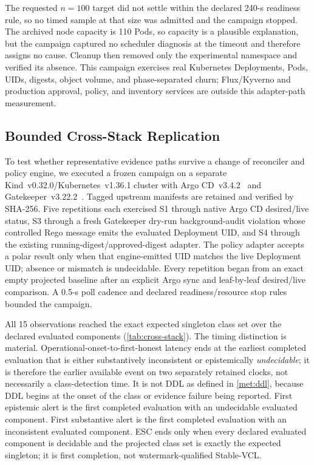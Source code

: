 The requested $n=100$ target did not settle within the declared 240-s
readiness rule, so no timed sample at that size was admitted and the campaign
stopped. The archived node capacity is 110 Pods, so capacity is a plausible
explanation, but the campaign captured no scheduler diagnosis at the timeout
and therefore assigns no cause. Cleanup then removed only the experimental
namespace and verified its absence. This
campaign exercises real Kubernetes Deployments, Pods, UIDs, digests, object
volume, and phase-separated churn; Flux/Kyverno and production approval,
policy, and inventory services are outside this adapter-path measurement.

\subsection{Bounded Cross-Stack Replication}
To test whether representative evidence paths survive a change of reconciler
and policy engine, we executed a frozen campaign on a separate
Kind~v0.32.0/Kubernetes~v1.36.1 cluster with Argo CD~v3.4.2~\cite{argocd} and
Gatekeeper~v3.22.2~\cite{gatekeeper}. Tagged upstream manifests are retained
and verified by SHA-256. Five repetitions each exercised S1 through native
Argo CD desired/live status, S3 through a fresh Gatekeeper dry-run
background-audit violation whose controlled Rego message emits the evaluated
Deployment UID, and S4 through the existing running-digest/approved-digest
adapter. The policy adapter accepts a polar result only when that engine-emitted
UID matches the live Deployment UID; absence or mismatch is undecidable. Every
repetition began from an exact empty projected baseline after an explicit Argo
sync and leaf-by-leaf desired/live comparison. A 0.5-s poll cadence and declared
readiness/resource stop rules bounded the campaign.

\begin{table}[t]
\centering
\caption{Bounded Argo CD/Gatekeeper Cross-Stack Replication. Exact Is the
Projected Class-Set Count; Operational-Onset-to-First-Honest, First
Substantive, and ESC Latencies Are Measured to Evaluation Completion, in
Seconds.}
\label{tab:cross-stack}
\scriptsize
\resizebox{\textwidth}{!}{}
\end{table}

All 15 observations reached the exact expected singleton class set over the
declared evaluated components (\cref{tab:cross-stack}). The timing distinction
is material. Operational-onset-to-first-honest latency ends at the earliest
completed evaluation that is either substantively inconsistent or
epistemically \emph{undecidable}; it is therefore the earlier available event
on two separately retained clocks, not necessarily a class-detection time.
It is not DDL as defined in \cref{met:ddl}, because DDL begins at the onset of
the class or evidence failure being reported. First epistemic alert is the
first completed evaluation with an undecidable evaluated component. First
substantive alert is the first completed evaluation with an inconsistent
evaluated component. ESC ends only when every declared evaluated component is
decidable and the projected class set is exactly the expected singleton; it is
first completion, not watermark-qualified Stable-VCL.

